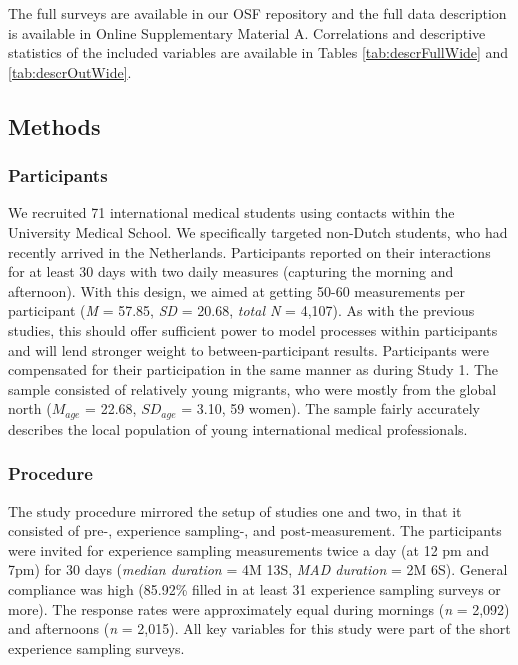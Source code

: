 The full surveys are available in our OSF repository
\citep{KreienkampMasked2022a} and the full data description is available
in Online Supplementary Material A. Correlations and descriptive
statistics of the included variables are available in Tables
\ref{tab:descrFullWide} and \ref{tab:descrOutWide}.

\subsection{Methods}

\subsubsection{Participants}

We recruited 71 international medical students using contacts within the
University Medical School. We specifically targeted non-Dutch students,
who had recently arrived in the Netherlands. Participants reported on
their interactions for at least 30 days with two daily measures
(capturing the morning and afternoon). With this design, we aimed at
getting 50-60 measurements per participant (\textit{M} = 57.85,
\textit{SD} = 20.68, \textit{total N} = 4,107). As with the previous
studies, this should offer sufficient power to model processes within
participants and will lend stronger weight to between-participant
results. Participants were compensated for their participation in the
same manner as during Study 1. The sample consisted of relatively young
migrants, who were mostly from the global north (\(M_{age}\) = 22.68,
\(SD_{age}\) = 3.10, 59 women). The sample fairly accurately describes
the local population of young international medical professionals.

\subsubsection{Procedure}

The study procedure mirrored the setup of studies one and two, in that
it consisted of pre-, experience sampling-, and post-measurement. The
participants were invited for experience sampling measurements twice a
day (at 12 pm and 7pm) for 30 days (\textit{median duration} = 4M 13S,
\textit{MAD duration} = 2M 6S). General compliance was high (85.92\%
filled in at least 31 experience sampling surveys or more). The response
rates were approximately equal during mornings (\textit{n} = 2,092) and
afternoons (\textit{n} = 2,015). All key variables for this study were
part of the short experience sampling surveys.

